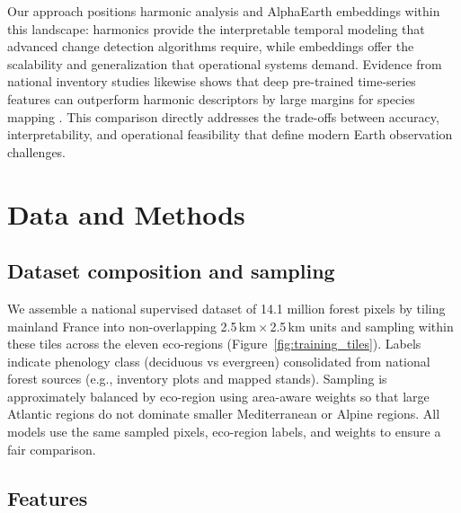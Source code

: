 \documentclass[utf8]{FrontiersinHarvard}
\begin{document}
Our approach positions harmonic analysis and AlphaEarth embeddings within this landscape: harmonics provide the interpretable temporal modeling that advanced change detection algorithms require, while embeddings offer the scalability and generalization that operational systems demand. Evidence from national inventory studies likewise shows that deep pre-trained time-series features can outperform harmonic descriptors by large margins for species mapping \citep{Ishikawa2025NFI}. This comparison directly addresses the trade-offs between accuracy, interpretability, and operational feasibility that define modern Earth observation challenges.

\section{Data and Methods}

\subsection{Dataset composition and sampling}
We assemble a national supervised dataset of 14.1 million forest pixels by tiling mainland France into non-overlapping 2.5\,km\,$\times$\,2.5\,km units and sampling within these tiles across the eleven eco-regions (Figure~\ref{fig:training_tiles}). Labels indicate phenology class (deciduous vs evergreen) consolidated from national forest sources (e.g., inventory plots and mapped stands). Sampling is approximately balanced by eco-region using area-aware weights so that large Atlantic regions do not dominate smaller Mediterranean or Alpine regions. All models use the same sampled pixels, eco-region labels, and weights to ensure a fair comparison.

\subsection{Features}
\end{document}
